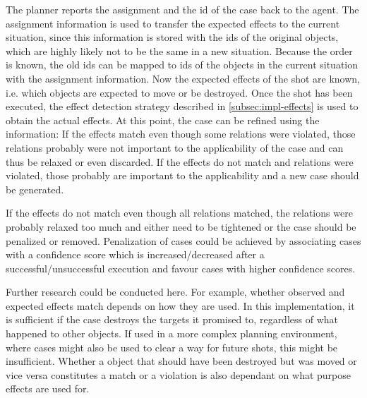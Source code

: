 The planner reports the assignment and the id of the case back to the agent. The assignment information is used to transfer the expected effects to the current situation, since this information is stored with the ids of the original objects, which are highly likely not to be the same in a new  situation.
Because the order is known, the old ids can be mapped to ids of the objects in the current situation with the assignment information.
Now the expected effects of the shot are known, i.e. which objects are expected to move or be destroyed.
Once the shot has been executed, the effect detection strategy described in \ref{subsec:impl-effects} is used to obtain the actual effects.
At this point, the case can be refined using the information: If the effects match even though some relations were violated, those relations probably were not important to the applicability of the case and can thus be relaxed or even discarded.
If the effects do not match and relations were violated, those probably are important to the applicability and a new case should be generated.

If the effects do not match even though all relations matched, the relations were probably relaxed too much and either need to be tightened or the case should be penalized or removed. Penalization of cases could be achieved by associating cases with a confidence score which is increased/decreased after a successful/unsuccessful execution and favour cases with higher confidence scores.


Further research could be conducted here. For example, whether observed and expected effects match depends on how they are used. In this implementation, it is sufficient if the case destroys the targets it promised to, regardless of what happened to other objects.
If used in a more complex planning environment, where cases might also be used to clear a way for future shots, this might be insufficient. Whether a object that should have been destroyed but was moved or vice versa constitutes a match or a violation is also dependant on what purpose effects are used for.